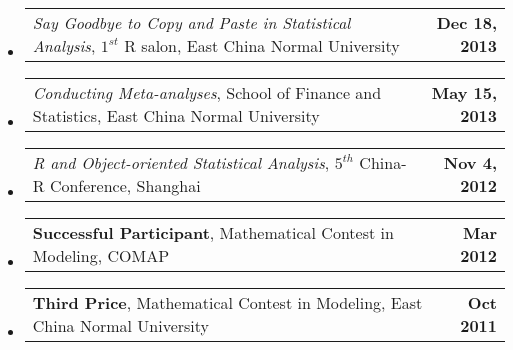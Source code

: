 \documentclass[10pt]{article}
\makeatletter
\newenvironment{unindentsection}[1]%
{\begin{list}{}%
	{\setlength{\leftmargin}{-0.5#1}}%
	\item[]%
}
{\end{list}}
\newcommand{\headerrow}[2]
{\begin{tabular*}{\linewidth}{l@{\extracolsep{\fill}}r}
	#1 &
	#2 \\
\end{tabular*}}
\makeatother
\begin{document}
\begin{unindentsection}{\parindent}
	\begin{itemize}
		\item
		\headerrow
			{\emph{Say Goodbye to Copy and Paste in Statistical Analysis}, $1^{st}$ R salon, East China Normal University}
			{\textbf{Dec 18, 2013}}
		\item
		\headerrow
			{\emph{Conducting Meta-analyses}, School of Finance and Statistics, East China Normal University}
			{\textbf{May 15, 2013}}
		\item 
		\headerrow
			{\emph{R and Object-oriented Statistical Analysis}, $5^{th}$ China-R Conference, Shanghai}
			{\textbf{Nov 4, 2012}}
		\item 
		\headerrow
			{\textbf{Successful Participant}, Mathematical Contest in Modeling, COMAP}
			{\textbf{Mar 2012}}
		\item
		\headerrow
			{\textbf{Third Price}, Mathematical Contest in Modeling, East China Normal University}
			{\textbf{Oct 2011}}
		
	\end{itemize}
\end{unindentsection}
\end{document}
